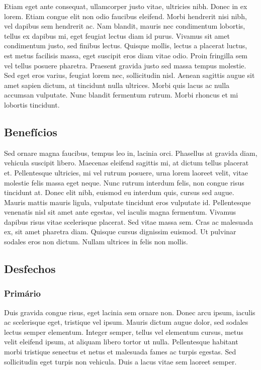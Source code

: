 \documentclass[
	12pt,				%
	a4paper,			%
    openany,
    oneside,
	english,			%
	french,				%
	spanish,			%
	brazil,				%
	]{abntex2}
\begin{document}
Etiam eget ante consequat, ullamcorper justo vitae, ultricies nibh. Donec in ex lorem. Etiam congue elit non odio faucibus eleifend. Morbi hendrerit nisi nibh, vel dapibus sem hendrerit ac. Nam blandit, mauris nec condimentum lobortis, tellus ex dapibus mi, eget feugiat lectus diam id purus. Vivamus sit amet condimentum justo, sed finibus lectus. Quisque mollis, lectus a placerat luctus, est metus facilisis massa, eget suscipit eros diam vitae odio. Proin fringilla sem vel tellus posuere pharetra. Praesent gravida justo sed massa tempus molestie. Sed eget eros varius, feugiat lorem nec, sollicitudin nisl. Aenean sagittis augue sit amet sapien dictum, at tincidunt nulla ultrices. Morbi quis lacus ac nulla accumsan vulputate. Nunc blandit fermentum rutrum. Morbi rhoncus et mi lobortis tincidunt.

\subsection{Benefícios}

Sed ornare magna faucibus, tempus leo in, lacinia orci. Phasellus at gravida diam, vehicula suscipit libero. Maecenas eleifend sagittis mi, at dictum tellus placerat et. Pellentesque ultricies, mi vel rutrum posuere, urna lorem laoreet velit, vitae molestie felis massa eget neque. Nunc rutrum interdum felis, non congue risus tincidunt at. Donec elit nibh, euismod eu interdum quis, cursus sed augue. Mauris mattis mauris ligula, vulputate tincidunt eros vulputate id. Pellentesque venenatis nisl sit amet ante egestas, vel iaculis magna fermentum. Vivamus dapibus risus vitae scelerisque placerat. Sed vitae massa sem. Cras ac malesuada ex, sit amet pharetra diam. Quisque cursus dignissim euismod. Ut pulvinar sodales eros non dictum. Nullam ultrices in felis non mollis.

\subsection{Desfechos}

\subsubsection{Primário}

Duis gravida congue risus, eget lacinia sem ornare non. Donec arcu ipsum, iaculis ac scelerisque eget, tristique vel ipsum. Mauris dictum augue dolor, sed sodales lectus semper elementum. Integer semper, tellus vel elementum cursus, metus velit eleifend ipsum, at aliquam libero tortor ut nulla. Pellentesque habitant morbi tristique senectus et netus et malesuada fames ac turpis egestas. Sed sollicitudin eget turpis non vehicula. Duis a lacus vitae sem laoreet semper. 
\end{document}
